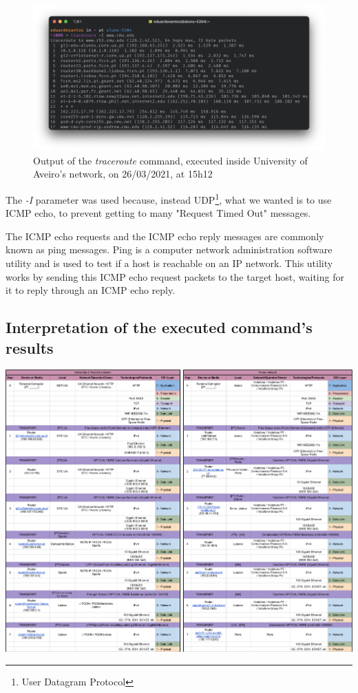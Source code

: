 \documentclass{article}
\begin{document}
\begin{figure}[H]
    \includegraphics[width=1 \textwidth]{images/tracerouteUA.png}
    \caption{Output of the \textit{traceroute} command, executed inside University of Aveiro's network, on 26/03/2021, at 15h12}
    \label{tracerouteUA}
\end{figure}


The \textit{-I} parameter was used because, instead UDP\footnote{User Datagram Protocol}, what we wanted is to use ICMP echo, to prevent getting to many "Request Timed Out" messages. 

The ICMP echo requests and the ICMP echo reply messages are commonly known as ping messages. Ping is a computer network administration software utility and is used to test if a host is reachable on an IP network. This utility works by sending this ICMP echo request packets to the target host, waiting for it to reply through an ICMP echo reply.

\subsection{Interpretation of the executed command's results}

\vspace*{\fill}
    \begin{center}
        \includegraphics[width=1 \textwidth]{images/traceroute_part1.png}
    \end{center}
\vspace*{\fill}
\end{document}
